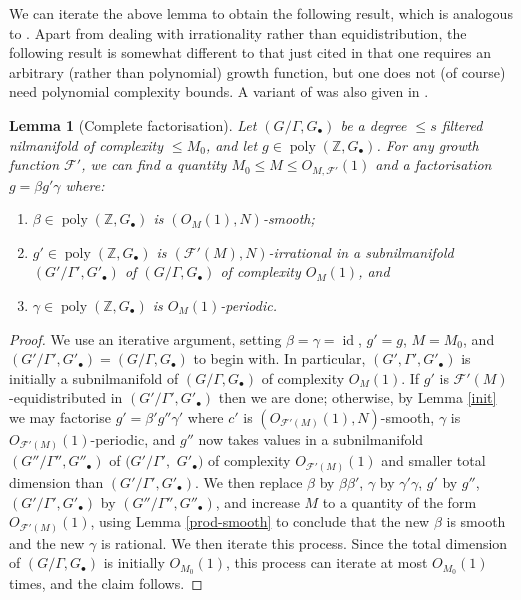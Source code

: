 \documentclass[11pt,reqno]{amsart}
\numberwithin{equation}{section}
\theoremstyle{plain}
\newtheorem{lemma}[subsection]{Lemma}
\theoremstyle{definition}
\renewcommand{\leq}{\leqslant}
\newcommand\Z{\mathbb{Z}}
\newcommand\1{{\bf 1}}
\newcommand\2{{\bf 2}}
\newcommand\poly{\operatorname{poly}}
\newcommand\id{\operatorname{id}}
\newcommand\Grow{{\mathcal F}}
\begin{document}
We can iterate the above lemma to obtain the following result, which is analogous to \cite[Theorem 1.19]{green-tao-nilratner}. Apart from dealing with irrationality rather than equidistribution, the following result is somewhat different to that just cited in that one requires an arbitrary (rather than polynomial) growth function, but one does not (of course) need polynomial complexity bounds. A variant of \cite[Theorem 1.19]{green-tao-nilratner} was also given in \cite[Theorem 4.2]{green-tao-ziegler-u4inverse}.

\begin{lemma}[Complete factorisation]\label{factor}   Let $(G/\Gamma,G_\bullet)$ be a degree $\leq s$ filtered nilmanifold of complexity $\leq M_0$, and let $g \in \poly(\Z, G_\bullet)$.  For any growth function $\Grow'$, we can find a quantity $M_0 \leq M \leq O_{M,\Grow'}(1)$ and a factorisation $g = \beta g' \gamma$ where:
\begin{enumerate}
\item $\beta \in \poly(\Z,G_\bullet)$ is $(O_{M}(1),N)$-smooth;
\item $g' \in \poly(\Z,G_\bullet)$ is $(\Grow'(M),N)$-irrational in a subnilmanifold \\ $(G'/\Gamma',G'_\bullet)$ of $(G/\Gamma,G_\bullet)$ of complexity $O_M(1)$, and
\item $\gamma \in \poly(\Z,G_\bullet)$ is $O_M(1)$-periodic.
\end{enumerate}
\end{lemma}

\begin{proof}  We use an iterative argument, setting $\beta =  \gamma = \id$, $g'=g$, $M= M_0$, and $(G'/\Gamma',G'_\bullet) =(G/\Gamma,G_\bullet)$ to begin with.  In particular, $(G',\Gamma',G'_\bullet)$ is initially a subnilmanifold of $(G/\Gamma,G_\bullet)$ of complexity $O_{M}(1)$.
If $g'$ is $\Grow'(M)$-equidistributed in $(G'/\Gamma',G'_\bullet)$ then we are done; otherwise, by Lemma \ref{init} we may factorise $g' = \beta' g'' \gamma'$ where $c'$ is $(O_{\Grow'(M)}(1),N)$-smooth, $\gamma$ is $O_{\Grow'(M)}(1)$-periodic, and $g''$ now takes values in a subnilmanifold $(G''/\Gamma'',G''_\bullet)$ of $(G'/\Gamma',$ $G'_\bullet)$ of complexity $O_{\Grow'(M)}(1)$ and smaller total dimension than $(G'/\Gamma',G'_\bullet)$.  We then replace $\beta$ by $\beta\beta'$, $\gamma$ by $\gamma' \gamma$, $g'$ by $g''$, $(G'/\Gamma',G'_\bullet)$ by $(G''/\Gamma'',G''_\bullet)$, and increase $M$ to a quantity of the form $O_{\Grow'(M)}(1)$, using Lemma \ref{prod-smooth} to conclude that the new $\beta$ is smooth and the new $\gamma$ is rational.  We then iterate this process.  Since the total dimension of $(G/\Gamma,G_\bullet)$ is initially $O_{M_0}(1)$, this process can iterate at most $O_{M_0}(1)$ times, and the claim follows.
\end{proof}
\end{document}
